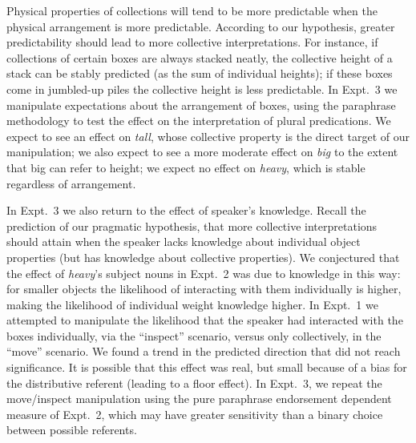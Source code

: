 \documentclass[preprint,12pt,authoryear,titlepage]{elsarticle}
\begin{document}

Physical properties of collections will tend to be more predictable when the physical arrangement is more predictable. 
According to our hypothesis, greater predictability should lead to more collective interpretations.
For instance, if collections of certain boxes are always stacked neatly, the collective height of a stack can be stably predicted (as the sum of individual heights); if these boxes come in jumbled-up piles the collective height is less predictable.
In Expt.~3 we manipulate expectations about the arrangement of boxes, using the paraphrase methodology to test the effect on the interpretation of plural predications. We expect to see an effect on \emph{tall}, whose collective property is the direct target of our manipulation; we also expect to see a more moderate effect on \emph{big} to the extent that big can refer to height; we expect no effect on \emph{heavy}, which is stable regardless of arrangement.

In Expt.~3 we also return to the effect of speaker's knowledge. Recall the prediction of our pragmatic hypothesis, that more collective interpretations should attain when the speaker lacks knowledge about individual object properties (but has knowledge about collective properties). We conjectured that the effect of \emph{heavy}'s subject nouns in Expt.~2 was due to knowledge in this way: for smaller objects the likelihood of interacting with them individually is higher, making the likelihood of individual weight knowledge higher.
In Expt.~1 we attempted to manipulate the likelihood that the speaker had interacted with the boxes individually, via the ``inspect'' scenario, versus only collectively, in the ``move'' scenario. We found a trend in the predicted direction that did not reach significance.
It is possible that this effect was real, but small because of a bias for the distributive referent (leading to a floor effect).
In Expt.~3, we repeat the move/inspect manipulation using the pure paraphrase endorsement dependent measure of Expt.~2, which may have greater sensitivity than a binary choice between possible referents.
\end{document}
